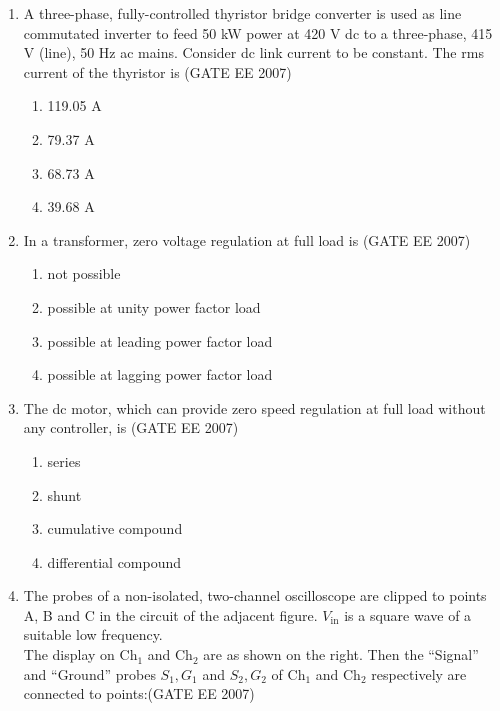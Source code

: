 \documentclass[a4paper,10pt]{exam}
\theoremstyle{remark}
\begin{document}
\begin{enumerate}
\item A three-phase, fully-controlled thyristor bridge converter is used as line commutated inverter to feed 50 kW power at 420 V dc to a three-phase, 415 V (line), 50 Hz ac mains. Consider dc link current to be constant. The rms current of the thyristor is \hfill{(GATE EE 2007)} 

\begin{multicols}{4}
\begin{enumerate}
 \item 119.05 A
\item  79.37 A
\item 68.73 A 
\item  39.68 A
\end{enumerate}
\end{multicols}

\item  In a transformer, zero voltage regulation at full load is \hfill{(GATE EE 2007)} 

\begin{multicols}{4}
\begin{enumerate}
 \item  not possible
\item   possible at unity power factor load 
\item  possible at leading power factor load 
\item  possible at lagging power factor load
\end{enumerate}
\end{multicols}

\item  The dc motor, which can provide zero speed regulation at full load without any controller, is \hfill{(GATE EE 2007)} 

\begin{multicols}{4}
\begin{enumerate}
 \item series
\item  shunt
\item cumulative compound
\item  differential compound
\end{enumerate}
\end{multicols}

\item  The probes of a non-isolated, two-channel oscilloscope are clipped to points A, B and C in the circuit of the adjacent figure. $V_{\text{in}}$ is a square wave of a suitable low frequency. \\
The display on Ch$_1$ and Ch$_2$ are as shown on the right. Then the ``Signal'' and ``Ground'' probes $S_1, G_1$ and $S_2, G_2$ of Ch$_1$ and Ch$_2$ respectively are connected to points:\hfill{(GATE EE 2007)} 


\end{enumerate}
\end{document}
